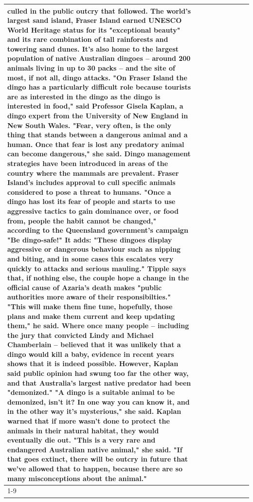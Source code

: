 \begin{table}[H]
\begin{tabular}{lllrlllll}
culled in the public outcry that followed. The world's largest sand island, Fraser Island earned UNESCO World Heritage status for its "exceptional beauty" and its rare combination of tall rainforests and towering sand dunes. It's also home to the largest population of native Australian dingoes -- around 200 animals living in up to 30 packs -- and the site of most, if not all, dingo attacks. "On Fraser Island the dingo has a particularly difficult role because tourists are as interested in the dingo as the dingo is interested in food," said Professor Gisela Kaplan, a dingo expert from the University of New England in New South Wales. "Fear, very often, is the only thing that stands between a dangerous animal and a human. Once that fear is lost any predatory animal can become dangerous," she said. Dingo management strategies have been introduced in areas of the country where the mammals are prevalent. Fraser Island's includes approval to cull specific animals considered to pose a threat to humans. "Once a dingo has lost its fear of people and starts to use aggressive tactics to gain dominance over, or food from, people the habit cannot be changed," according to the Queensland government's campaign "Be dingo-safe!" It adds: "These dingoes display aggressive or dangerous behaviour such as nipping and biting, and in some cases this escalates very quickly to attacks and serious mauling." Tipple says that, if nothing else, the couple hope a change in the official cause of Azaria's death makes "public authorities more aware of their responsibilties." "This will make them fine tune, hopefully, those plans and make them current and keep updating them," he said. Where once many people -- including the jury that convicted Lindy and Michael Chamberlain -- believed that it was unlikely that a dingo would kill a baby, evidence in recent years shows that it is indeed possible. However, Kaplan said public opinion had swung too far the other way, and that Australia's largest native predator had been "demonized." "A dingo is a suitable animal to be demonized, isn't it? In one way you can know it, and in the other way it's mysterious," she said. Kaplan warned that if more wasn't done to protect the animals in their natural habitat, they would eventually die out. "This is a very rare and endangered Australian native animal," she said. "If that goes extinct, there will be outcry in future that we've allowed that to happen, because there are so many misconceptions about the animal." \\
\cline{1-9}

\end{tabular}
\end{table}
